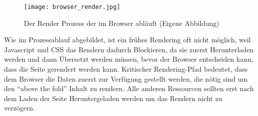 		\begin{figure}[htbp]
			\begin{center}
				\texttt{[image: browser\_render.jpg]}
				\caption{Der Render Prozess der im Browser abläuft (Eigene Abbildung)}
				\label{fig:browser_render}
			\end{center}
		\end{figure}
	
		Wie im Prozessablauf abgebildet, ist ein frühes Rendering oft nicht möglich, weil Javascript und CSS das Rendern dadurch Blockieren, da sie zuerst Herunterladen werden und dann Übersetzt werden müssen, bevor der Browser entscheiden kann, dass die Seite gerendert werden kann. Kritischer Rendering-Pfad bedeutet, dass dem Browser die Daten zuerst zur Verfügung gestellt werden, die nötig sind um den "`above the fold"' Inhalt zu rendern. Alle anderen Ressourcen sollten erst nach dem Laden der Seite Heruntergeladen werden um das Rendern nicht zu verzögern. 





\pagebreak
